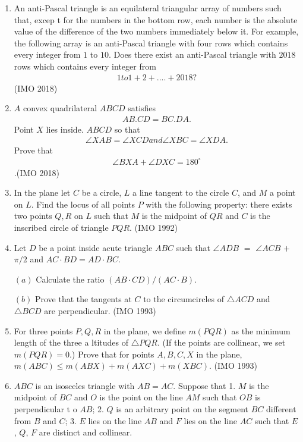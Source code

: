 \begin{enumerate}
\item An anti-Pascal triangle is an equilateral triangular array of numbers such that, excep    t for the numbers in the bottom row, each number is the absolute value of the difference of the two numbers immediately below it. For example, the following array is an anti-Pascal triangle with four rows which contains every integer from $1$ to $10$.
	Does there exist an anti-Pascal triangle with $2018$ rows which contains every integer from \begin{align}1 to 1+2 +....+2018?\end{align} \hfill (IMO 2018)
		\item $A$ convex quadrilateral $ABCD$ satisfies \begin{align}AB.CD=BC.DA.\end{align} Point $X$ lies inside. $ABCD$ so that \begin{align}\angle XAB=\angle XCD and \angle XBC=\angle XDA.    \end{align} Prove that\begin{align}\angle BXA+\angle DXC=180^\circ\end{align}.\hfill (IMO 2018)
\item In the plane let $C$ be a circle, $L$ a line  tangent to the circle $C$, and $M$ a point on $L$. Find the locus of all points $P$ with the following property: there exists two points $Q,R$ on $L$ such that $M$ is the midpoint of $QR$ and $C$ is the inscribed circle of triangle $PQR$.  \hfill(IMO 1992)
\item Let $D$ be a point inside acute triangle $ABC$ such that $\angle ADB$ $=$ $\angle ACB$ $+$ $\pi/2$ and $AC \cdot BD = AD \cdot BC$.
 
  $(a)$ Calculate the ratio $(AB \cdot CD) / (AC \cdot B)$.
 
 $(b)$ Prove that the tangents at $C$ to the circumcircles of $\triangle ACD$ and $\triangle BCD$ are perpendicular. \hfill(IMO 1993)
		
\item For three points $P, Q, R$ in the plane, we define $m(PQR)$ as the minimum length of the three a
ltitudes of $\triangle PQR$. (If the points are collinear, we set $m(PQR) = 0$.)                                                                           
  Prove that for points $A, B, C, X$ in the plane,
                                                     $m(ABC) \leq m(ABX) + m(AXC) + m(XBC)$. \hfill(IMO 1993)
\item $ABC$ is an isosceles triangle with $AB = AC$. Suppose that  
	1. $M$ is the midpoint of $BC$ and $O$ is the point on the line $AM$ such that $OB$ is perpendicular t    o $AB$;                                                                               
2. $Q$ is an arbitrary point on the segment $BC$ different from $B$ and $C$;                           
 3. $E$ lies on the line $AB$ and $F$ lies on the line $AC$ such that $E$, $Q$, $F$ are distinct and collinear.
 

\end{enumerate}
